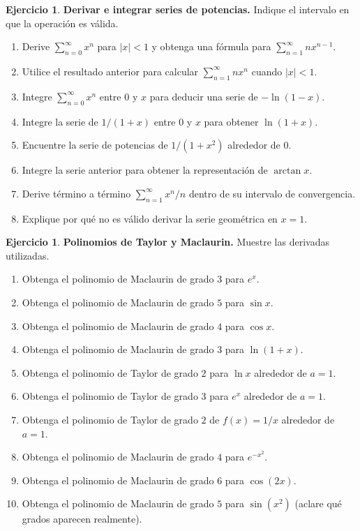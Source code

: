 \documentclass[12pt]{article}
\theoremstyle{definition}
\newtheorem{Ejer}[teorema]{Ejercicio}
\theoremstyle{remark}
\begin{document}
\begin{Ejer}\textbf{Derivar e integrar series de potencias.} Indique el intervalo en que la operación es válida.
\begin{enumerate}[resume=banco4]
\item Derive $\sum_{n=0}^\infty x^n$ para $|x|<1$ y obtenga una fórmula para $\sum_{n=1}^\infty nx^{n-1}$.
\item Utilice el resultado anterior para calcular $\sum_{n=1}^\infty nx^n$ cuando $|x|<1$.
\item Integre $\sum_{n=0}^\infty x^n$ entre $0$ y $x$ para deducir una serie de $-\ln(1-x)$.
\item Integre la serie de $1/(1+x)$ entre $0$ y $x$ para obtener $\ln(1+x)$.
\item Encuentre la serie de potencias de $1/(1+x^2)$ alrededor de $0$.
\item Integre la serie anterior para obtener la representación de $\arctan x$.
\item Derive término a término $\sum_{n=1}^\infty x^n/n$ dentro de su intervalo de convergencia.
\item Explique por qué no es válido derivar la serie geométrica en $x=1$.
\end{enumerate}
\end{Ejer}

\begin{Ejer}\textbf{Polinomios de Taylor y Maclaurin.} Muestre las derivadas utilizadas.
\begin{enumerate}[resume=banco4]
\item Obtenga el polinomio de Maclaurin de grado $3$ para $e^x$.
\item Obtenga el polinomio de Maclaurin de grado $5$ para $\sin x$.
\item Obtenga el polinomio de Maclaurin de grado $4$ para $\cos x$.
\item Obtenga el polinomio de Maclaurin de grado $3$ para $\ln(1+x)$.
\item Obtenga el polinomio de Taylor de grado $2$ para $\ln x$ alrededor de $a=1$.
\item Obtenga el polinomio de Taylor de grado $3$ para $e^x$ alrededor de $a=1$.
\item Obtenga el polinomio de Taylor de grado $2$ de $f(x)=1/x$ alrededor de $a=1$.
\item Obtenga el polinomio de Maclaurin de grado $4$ para $e^{-x^2}$.
\item Obtenga el polinomio de Maclaurin de grado $6$ para $\cos(2x)$.
\item Obtenga el polinomio de Maclaurin de grado $5$ para $\sin(x^2)$ (aclare qué grados aparecen realmente).
\end{enumerate}
\end{Ejer}
\end{document}
